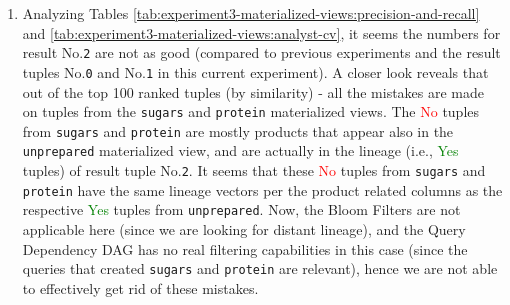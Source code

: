 \begin{experiment-withrun}
\begin{enumerate}
    \item Analyzing Tables \ref{tab:experiment3-materialized-views:precision-and-recall} and \ref{tab:experiment3-materialized-views:analyst-cv}, it seems the numbers for result No.\texttt{2} are not as good (compared to previous experiments and the result tuples No.\texttt{0} and No.\texttt{1} in this current experiment). A closer look reveals that out of the top 100 ranked tuples (by similarity) - all the mistakes are made on tuples from the \texttt{sugars} and \texttt{protein} materialized views. The \textcolor{Red}{No} tuples from \texttt{sugars} and \texttt{protein} are mostly products that appear also in the \texttt{unprepared} materialized view, and are actually in the lineage (i.e., \textcolor{Green}{Yes} tuples) of result tuple No.\texttt{2}. It seems that these \textcolor{Red}{No} tuples from \texttt{sugars} and \texttt{protein} have the same lineage vectors per the product related columns as the respective \textcolor{Green}{Yes} tuples from \texttt{unprepared}. Now, the Bloom Filters are not applicable here (since we are looking for distant lineage), and the Query Dependency DAG has no real filtering capabilities in this case (since the queries that created \texttt{sugars} and \texttt{protein} are relevant), hence we are not able to effectively get rid of these mistakes.

\end{enumerate}






\end{experiment-withrun}


